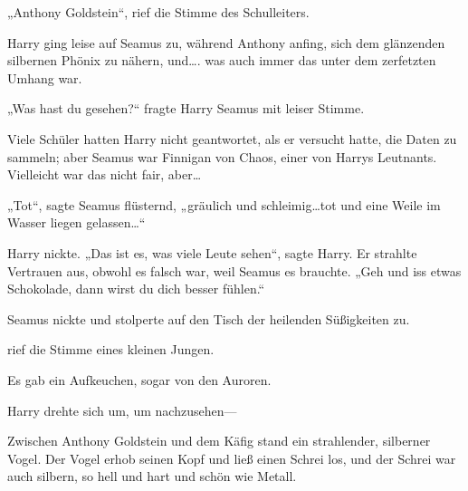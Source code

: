 „Anthony Goldstein“, rief die Stimme des Schulleiters.

Harry ging leise auf Seamus zu, während Anthony anfing, sich dem glänzenden silbernen Phönix zu nähern, und…. was auch immer das unter dem zerfetzten Umhang war.

„Was hast du gesehen?“ fragte Harry Seamus mit leiser Stimme.

Viele Schüler hatten Harry nicht geantwortet, als er versucht hatte, die Daten zu sammeln; aber Seamus war Finnigan von Chaos, einer von Harrys Leutnants. Vielleicht war das nicht fair, aber…

„Tot“, sagte Seamus flüsternd, „gräulich und schleimig…tot und eine Weile im Wasser liegen gelassen…“

Harry nickte. „Das ist es, was viele Leute sehen“, sagte Harry. Er strahlte Vertrauen aus, obwohl es falsch war, weil Seamus es brauchte. „Geh und iss etwas Schokolade, dann wirst du dich besser fühlen.“

Seamus nickte und stolperte auf den Tisch der heilenden Süßigkeiten zu.

 rief die Stimme eines kleinen Jungen.

Es gab ein Aufkeuchen, sogar von den Auroren.

Harry drehte sich um, um nachzusehen—

Zwischen Anthony Goldstein und dem Käfig stand ein strahlender, silberner Vogel. Der Vogel erhob seinen Kopf und ließ einen Schrei los, und der Schrei war auch silbern, so hell und hart und schön wie Metall.

